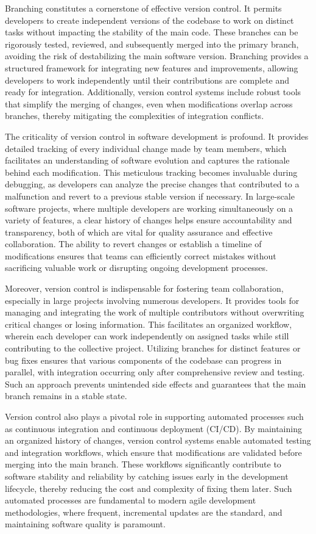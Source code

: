 Branching constitutes a cornerstone of effective version control. It permits developers to create independent versions of the codebase to work on distinct tasks without impacting the stability of the main code. These branches can be rigorously tested, reviewed, and subsequently merged into the primary branch, avoiding the risk of destabilizing the main software version. Branching provides a structured framework for integrating new features and improvements, allowing developers to work independently until their contributions are complete and ready for integration. Additionally, version control systems include robust tools that simplify the merging of changes, even when modifications overlap across branches, thereby mitigating the complexities of integration conflicts.

The criticality of version control in software development is profound. It provides detailed tracking of every individual change made by team members, which facilitates an understanding of software evolution and captures the rationale behind each modification. This meticulous tracking becomes invaluable during debugging, as developers can analyze the precise changes that contributed to a malfunction and revert to a previous stable version if necessary. In large-scale software projects, where multiple developers are working simultaneously on a variety of features, a clear history of changes helps ensure accountability and transparency, both of which are vital for quality assurance and effective collaboration. The ability to revert changes or establish a timeline of modifications ensures that teams can efficiently correct mistakes without sacrificing valuable work or disrupting ongoing development processes.

Moreover, version control is indispensable for fostering team collaboration, especially in large projects involving numerous developers. It provides tools for managing and integrating the work of multiple contributors without overwriting critical changes or losing information. This facilitates an organized workflow, wherein each developer can work independently on assigned tasks while still contributing to the collective project. Utilizing branches for distinct features or bug fixes ensures that various components of the codebase can progress in parallel, with integration occurring only after comprehensive review and testing. Such an approach prevents unintended side effects and guarantees that the main branch remains in a stable state.

Version control also plays a pivotal role in supporting automated processes such as continuous integration and continuous deployment (CI/CD). By maintaining an organized history of changes, version control systems enable automated testing and integration workflows, which ensure that modifications are validated before merging into the main branch. These workflows significantly contribute to software stability and reliability by catching issues early in the development lifecycle, thereby reducing the cost and complexity of fixing them later. Such automated processes are fundamental to modern agile development methodologies, where frequent, incremental updates are the standard, and maintaining software quality is paramount.

